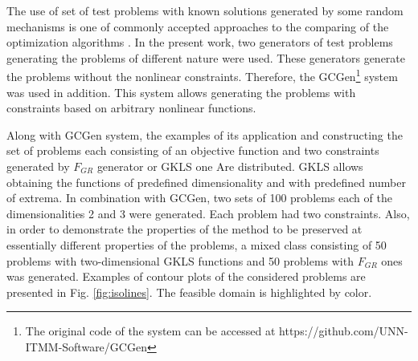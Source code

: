 \documentclass[runningheads]{llncs}
\begin{document}
The use of set of test problems with known solutions generated by some random mechanisms is
one of commonly accepted approaches to the comparing of the optimization algorithms
\cite{Beiranvand2017}.
In the present work, two generators of test problems generating the problems of different nature
\cite{grishaginClass, Gaviano2003} were used.
These generators generate the problems without the nonlinear constraints. Therefore, the
GCGen\footnote{The original code of the system can be accessed at https://github.com/UNN-
ITMM-Software/GCGen} \cite{GergelBarkalov2019} system was used in addition.
This system allows generating the problems with constraints based on arbitrary nonlinear
functions.

Along with GCGen system, the examples of its application and constructing the set of problems
each consisting of an objective function and two constraints generated by \(F_{GR}\)
\cite{grishaginClass} generator or GKLS \cite{Gaviano2003} one Are distributed.
GKLS \cite{Gaviano2003} allows obtaining the functions of predefined dimensionality and
with predefined number of extrema.
In combination with GCGen, two sets of 100 problems each of the dimensionalities 2 and 3
were generated.
Each problem had two constraints.
Also, in order to demonstrate the properties of the method to be preserved at essentially
different properties of the problems, a mixed class consisting of 50 problems with 
two-dimensional GKLS functions and 50 problems with \(F_{GR}\) ones was generated.
Examples of contour plots of the considered problems are presented in Fig. \ref{fig:isolines}.
The feasible domain is highlighted by color.
\end{document}
